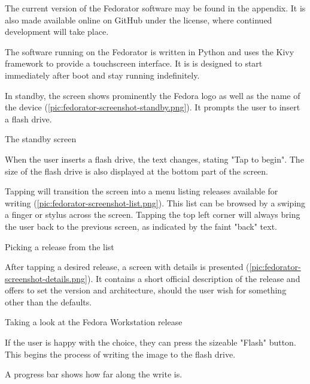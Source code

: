         The current version of the Fedorator software may be found in the appendix.  It is also made available online on GitHub under the  license\cite{fedorator-github}, where continued development will take place.  
        
        The software running on the Fedorator is written in Python and uses the Kivy framework to provide a touchscreen interface.  It is is designed to start immediately after boot and stay running indefinitely.
        
        In standby, the screen shows prominently the Fedora logo as well as the name of the device (\ref{pic:fedorator-screenshot-standby.png}).  It prompts the user to insert a flash drive.
        
            {The standby screen}
        
        When the user inserts a flash drive, the text changes, stating "Tap to begin".  The size of the flash drive is also displayed at the bottom part of the screen.
        
        Tapping will transition the screen into a menu listing releases available for writing (\ref{pic:fedorator-screenshot-list.png}).  This list can be browsed by a swiping a finger or stylus across the screen.  Tapping the top left corner will always bring the user back to the previous screen, as indicated by the faint "back" text. 
        
            {Picking a release from the list}
        
        After tapping a desired release, a screen with details is presented (\ref{pic:fedorator-screenshot-details.png}).  It contains a short official description of the release and offers to set the version and architecture, should the user wish for something other than the defaults.
        
            {Taking a look at the Fedora Workstation release}
        
        If the user is happy with the choice, they can press the sizeable "Flash" button.  This begins the process of writing the image to the flash drive.
        
        
        A progress bar shows how far along the write is.
        
